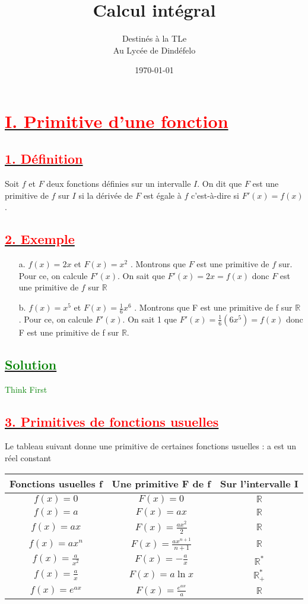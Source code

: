 \documentclass[12pt]{article}
\author{Destinés à la TLe\\Au Lycée de Dindéfelo}
\title{\textbf{Calcul intégral}}
\date{\today}
\begin{document}
\maketitle
\newpage
\section*{\underline{\textbf{\textcolor{red}{I. Primitive d’une fonction}}}}
\subsection*{\underline{\textbf{\textcolor{red}{1. Définition}}}}
Soit $f$ et $F$ deux fonctions définies sur un intervalle $I$. On dit que $F$ est une primitive de $f$ sur $I$ si la dérivée de $F$ est égale à $f$ c’est-à-dire si $F'(x) = f(x)$.
\subsection*{\underline{\textbf{\textcolor{red}{2. Exemple}}}}
\begin{itemize}
\item[a.] $f(x) = 2x$ et $F(x) = x^{2}$ . Montrons que $F$ est une primitive de $f$ sur. Pour ce, on calcule $F'(x)$. On sait que $F'(x) = 2x = f(x)$ donc $F$ est une primitive de $f$ sur $\mathbb{R}$
\item[b.] $f(x) = x^{5}$ et $F(x) = \frac{1}{6}x^{6}$ . Montrons que F est une primitive de f sur $\mathbb{R}$ . Pour ce, on calcule $F'(x)$. On sait 1 que $F'(x) =\frac{1}{6}(6x^{5})= f(x)$ donc F est une primitive de f sur $\mathbb{R}$.
\end{itemize}
\subsection*{\underline{\textbf{\textcolor{green}{Solution}}}}
\textcolor{green}{Think First}
\subsection*{\underline{\textbf{\textcolor{red}{3. Primitives de fonctions usuelles}}}}
Le tableau suivant donne une primitive de certaines fonctions usuelles : a est un réel constant

\begin{center}
\begin{tabular}{|c|c|c|}
\hline
Fonctions usuelles f & Une primitive F de f &  Sur l’intervalle I   \\
\hline
$f(x) = 0$& $F(x)=0$& $\mathbb{R}$  \\
\hline
$f(x) = a$& $F(x) = ax$  &  $\mathbb{R}$\\
\hline
$f(x) = ax$& $F(x) = \frac{ax^{2}}{2}$& $\mathbb{R}$  \\
\hline
$f(x) = ax^{n}$& $F(x) = \frac{ax^{n+1}}{n+1}$ & $\mathbb{R}$ \\
\hline
$f(x) = \frac{a}{x^{2}}$& $F(x) = -\frac{a}{x}$ & $\mathbb{R}^{*}$ \\
\hline
$f(x) = \frac{a}{x}$& $F(x) = a\ln x$ & $\mathbb{R}^{*}_{+}$ \\
\hline
$f(x) = e^{ax}$& $F(x) = \frac{e^{ax}}{a}$ & $\mathbb{R}$ \\
\hline
\end{tabular}
\end{center}
\end{document}

